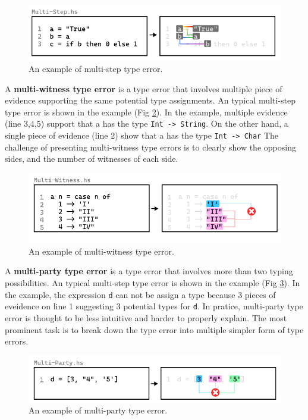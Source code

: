 \begin{figure}[hbt]
  \includegraphics[width=\linewidth]{Multi-Step}
  \caption{
    \label{fig:multi-step-example}
    An example of multi-step type error.
    }
\end{figure}

A \textbf{multi-witness type error} is a type error that involves multiple piece of evidence supporting the same potential type assignments.  An typical multi-step type error is shown in the example (Fig \ref{fig:multi-witness-example}). In the example, multiple evidence (line 3,4,5) support that a has the type \texttt{Int -> String}. On the other hand, a single piece of evidence (line 2) show that a has the type \texttt{Int -> Char}  The challenge of presenting multi-witness type errors is to clearly show the opposing sides, and the number of witnesses of each side. 

\begin{figure}[hbt]
  \includegraphics[width=\linewidth]{Multi-Witness}
  \caption{
    \label{fig:multi-witness-example}
    An example of multi-witness type error.
    }
\end{figure}

A \textbf{multi-party type error} is a type error that involves more than two typing possibilities.  An typical multi-step type error is shown in the example (Fig \ref{fig:multi-party-example}). In the example, the expression \texttt{d} can not be assign a type because 3 pieces of eveidence on line 1 suggesting 3 potential types for \texttt{d}. In pratice, multi-party type error is thought to be less intuitive and harder to properly explain. The most prominent task is to break down the type error into multiple simpler form of type errors. 



\begin{figure}[hbt]
  \includegraphics[width=\linewidth]{Multi-Party}
  \caption{
    \label{fig:multi-party-example}
    An example of multi-party type error.
    }
\end{figure}

